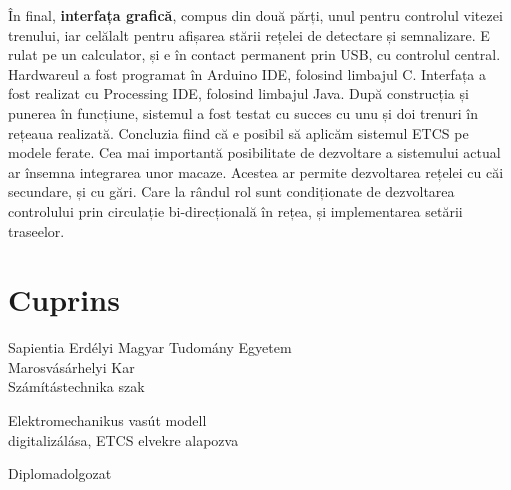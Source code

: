 \documentclass[a4paper,12pt]{article}
\begin{document}
În final, \textbf{interfața grafică}, compus din două părți, unul pentru controlul vitezei trenului, iar celălalt pentru afișarea stării rețelei de detectare și semnalizare. E rulat pe un calculator, și e în contact permanent prin USB, cu controlul central.
Hardwareul a fost programat în Arduino IDE, folosind limbajul C. Interfața a fost realizat cu Processing IDE, folosind limbajul Java.
După construcția și punerea în funcțiune, sistemul a fost testat cu succes cu unu și doi trenuri în rețeaua realizată. Concluzia fiind că e posibil să aplicăm sistemul ETCS pe modele ferate.
Cea mai importantă posibilitate de dezvoltare a sistemului actual ar însemna integrarea unor macaze. Acestea ar permite dezvoltarea rețelei cu căi secundare, și cu gări.
Care la rândul rol sunt condiționate de dezvoltarea controlului prin circulație bi-direcțională în rețea, și implementarea setării traseelor. 

\newpage
\section*{Cuprins}
	\begingroup
	\renewcommand{\section}[2]{}
	\romaniantableofcontents
	\endgroup


\newpage
\pagestyle{empty}

	\begin{center}
		{\Large Sapientia Erdélyi Magyar Tudomány Egyetem}\\\vspace{0.07in}
		{\Large Marosvásárhelyi Kar}\\\vspace{0.07in}
		{\Large Számítástechnika szak}\\
		
		\vspace{2.35in}
		
		{\huge Elektromechanikus vasút modell }\\\vspace{0.15in}
		{\huge digitalizálása, ETCS elvekre alapozva}
		
		\vspace{0.5in}
		
		{\LARGE Diplomadolgozat}
		
	\end{center}
	
	\vspace{2.0in}
	
\end{document}
